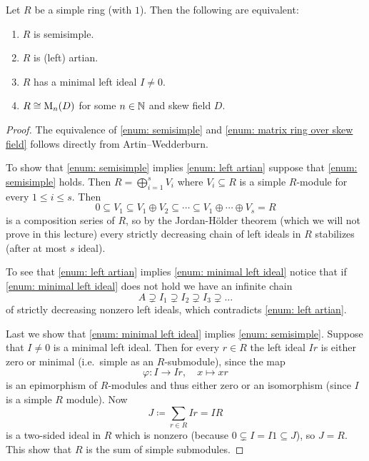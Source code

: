 \begin{theorem}[Wedderburn]
  Let $R$ be a simple ring (with $1$). Then the following are equivalent:
  \begin{enumerate}[label=\emph{\roman*)},leftmargin=*]
    \item \label{enum: semisimple}
      $R$ is semisimple.
    \item \label{enum: left artian}
      $R$ is (left) artian.
    \item \label{enum: minimal left ideal}
      $R$ has a minimal left ideal $I \neq 0$.
    \item \label{enum: matrix ring over skew field}
      $R \cong \operatorname{M}_n(D)$ for some $n \in \mathbb{N}$ and skew field $D$.
  \end{enumerate}
\end{theorem}
\begin{proof}
  The equivalence of \ref{enum: semisimple} and \ref{enum: matrix ring over skew field} follows directly from Artin--Wedderburn.
  
  To show that \ref{enum: semisimple} implies \ref{enum: left artian} suppose that \ref{enum: semisimple} holds.
  Then $R = \bigoplus_{i=1}^s V_i$ where $V_i \subseteq R$ is a simple $R$-module for every $1 \leq i \leq s$.
  Then
  \[
              0
    \subseteq V_1
    \subseteq V_1 \oplus V_2
    \subseteq \dotsb
    \subseteq V_1 \oplus \dotsb \oplus V_s
    =         R
  \]
  is a composition series of $R$, so by the Jordan-Hölder theorem (which we will not prove in this lecture) every strictly decreasing chain of left ideals in $R$ stabilizes (after at most $s$ ideal).
  
  To see that \ref{enum: left artian} implies \ref{enum: minimal left ideal} notice that if \ref{enum: minimal left ideal} does not hold we have an infinite chain
  \[
                A
    \supsetneq  I_1
    \supsetneq  I_2
    \supsetneq  I_3
    \supsetneq  \dotso
  \]
  of strictly decreasing nonzero left ideals, which contradicts \ref{enum: left artian}.
  
  Last we show that \ref{enum: minimal left ideal} implies \ref{enum: semisimple}.
  Suppose that $I \neq 0$ is a minimal left ideal.
  Then for every $r \in R$ the left ideal $Ir$ is either zero or minimal (i.e.\ simple as an $R$-submodule), since the map
  \[
            \varphi
    \colon  I
    \to     Ir,
    \quad   x
    \mapsto xr
  \]
  is an epimorphism of $R$-modules and thus either zero or an isomorphism (since $I$ is a simple $R$ module).
  Now
  \[
              J
    \coloneqq \sum_{r \in R} Ir
    =         IR
  \]
  is a two-sided ideal in $R$ which is nonzero (because $0 \subsetneq I = I1 \subseteq J$), so $J = R$.
  This show that $R$ is the sum of simple submodules.
\end{proof}


